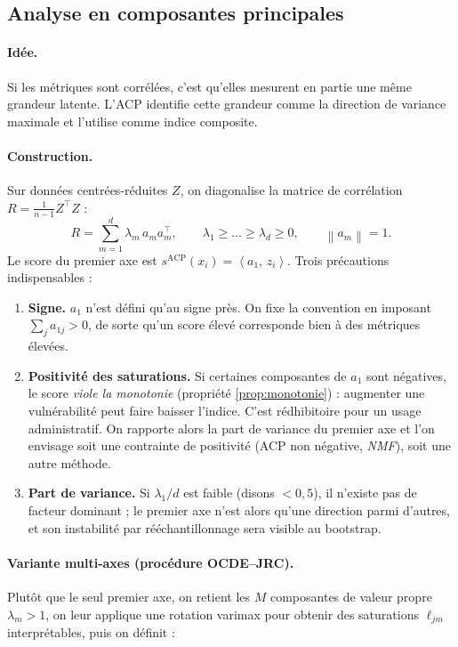 \documentclass[11pt,a4paper]{article}
\theoremstyle{definition}
\theoremstyle{remark}
\newcommand{\norm}[1]{\left\lVert #1 \right\rVert}
\newcommand{\scal}[2]{\left\langle #1 ,\, #2 \right\rangle}
\begin{document}
\bigskip

\subsection{Analyse en composantes principales}
\label{sec:acp}

\paragraph{Idée.} Si les métriques sont corrélées, c'est qu'elles mesurent en partie une même
grandeur latente. L'ACP identifie cette grandeur comme la direction de variance maximale et
l'utilise comme indice composite.

\paragraph{Construction.} Sur données centrées-réduites $Z$, on diagonalise la matrice de
corrélation $R = \frac{1}{n-1}Z^\top Z$ :
\[
R = \sum_{m=1}^{d}\lambda_m\, a_m a_m^\top,
\qquad \lambda_1 \ge \dots \ge \lambda_d \ge 0,
\qquad \norm{a_m} = 1.
\]
Le score du premier axe est $s^{\mathrm{ACP}}(x_i) = \scal{a_1}{z_i}$. Trois précautions
indispensables :
\begin{enumerate}[nosep,leftmargin=1.6em]
  \item \textbf{Signe.} $a_1$ n'est défini qu'au signe près. On fixe la convention en imposant
  $\sum_j a_{1j} > 0$, de sorte qu'un score élevé corresponde bien à des métriques élevées.
  \item \textbf{Positivité des saturations.} Si certaines composantes de $a_1$ sont négatives, le
  score \emph{viole la monotonie} (propriété \ref{prop:monotonie}) : augmenter une vulnérabilité
  peut faire baisser l'indice. C'est rédhibitoire pour un usage administratif. On rapporte alors
  la part de variance du premier axe et l'on envisage soit une contrainte de positivité (ACP non
  négative, \emph{NMF}), soit une autre méthode.
  \item \textbf{Part de variance.} Si $\lambda_1/d$ est faible (disons $< 0{,}5$), il n'existe pas
  de facteur dominant ; le premier axe n'est alors qu'une direction parmi d'autres, et son
  instabilité par rééchantillonnage sera visible au bootstrap.
\end{enumerate}

\bigskip

\paragraph{Variante multi-axes (procédure OCDE--JRC).} Plutôt que le seul premier axe, on retient
les $M$ composantes de valeur propre $\lambda_m > 1$, on leur applique une rotation varimax pour
obtenir des saturations $\ell_{jm}$ interprétables, puis on définit :
\end{document}
